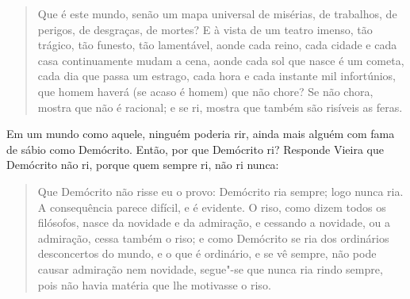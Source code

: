 \begin{quote}
Que é este mundo, senão um mapa universal de misérias, de trabalhos,
de perigos, de desgraças, de mortes? E à vista de um teatro imenso, tão
trágico, tão funesto, tão lamentável, aonde cada reino, cada cidade e
cada casa continuamente mudam a cena, aonde cada sol que nasce é um
cometa, cada dia que passa um estrago, cada hora e cada instante mil
infortúnios, que homem haverá (se acaso é homem) que não chore? Se não
chora, mostra que não é racional; e se ri, mostra que também são
risíveis as feras.
\end{quote}

Em um mundo como aquele, ninguém poderia rir, ainda mais alguém com fama
de sábio como Demócrito. Então, por que Demócrito ri? Responde Vieira
que Demócrito não ri, porque quem sempre ri, não ri nunca:

\begin{quote}
Que Demócrito não risse eu o provo: Demócrito ria sempre; logo nunca
ria. A consequência parece difícil, e é evidente. O riso, como dizem
todos os filósofos, nasce da novidade e da admiração, e cessando a
novidade, ou a admiração, cessa também o riso; e como Demócrito se ria
dos ordinários desconcertos do mundo, e o que é ordinário, e se vê
sempre, não pode causar admiração nem novidade, segue"-se que nunca ria
rindo sempre, pois não havia matéria que lhe motivasse o riso.
\end{quote}
